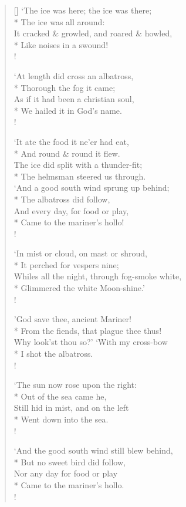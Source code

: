 \documentclass[MAIN]{subfiles}
\begin{document}
\begin{verse}[\versewidth]
`The ice was here; the ice was there;\\*
\vin The ice was all around:\\
It cracked \& growled, and roared \& howled,\\*
\vin Like noises in a swound!\\!

`At length did cross an albatross,\\*
\vin Thorough the fog it came;\\
As if it had been a christian soul,\\*
\vin We hailed it in God's name.\\!

`It ate the food it ne'er had eat,\\*
\vin And round \& round it flew.\\
The ice did split with a thunder-fit;\\*
\vin The helmsman steered us through.\\

`And a good south wind sprung up behind;\\*
\vin The albatross did follow,\\
And every day, for food or play,\\*
\vin Came to the mariner's hollo!\\!

`In mist or cloud, on mast or shroud,\\*
\vin It perched for vespers nine;\\
Whiles all the night, through fog-smoke white,\\*
\vin Glimmered the white Moon-shine.'\\!

'God save thee, ancient Mariner!\\*
\vin From the fiends, that plague thee thus!\\
Why look'st thou so?' `With my cross-bow\\*
\vin I shot the albatross.\\!

 `The sun now rose upon the right:\\*
\vin Out of the sea came he,\\
Still hid in mist, and on the left\\*
\vin Went down into the sea.\\!

`And the good south wind still blew behind,\\*
\vin But no sweet bird did follow,\\
Nor any day for food or play\\*
\vin Came to the mariner's hollo.\\!


\end{verse}
\end{document}

